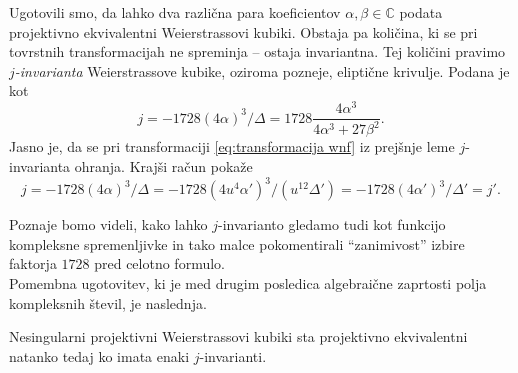 \documentclass[mat1]{fmfdelo}
\newcommand{\C}{\mathbb C}
\theoremstyle{definition}
\begin{document}
Ugotovili smo, da lahko dva različna para koeficientov $\alpha, \beta \in \C$ podata projektivno ekvivalentni Weierstrassovi kubiki. Obstaja pa količina, ki se pri tovrstnih transformacijah ne spreminja -- ostaja invariantna. Tej količini pravimo \emph{$j$-invarianta} Weierstrassove kubike, oziroma pozneje, eliptične krivulje. Podana je kot 
\[
    j = -1728(4\alpha)^3/\Delta = 1728\frac{4\alpha^3}{4\alpha^3 + 27\beta^2}.  
\] 
Jasno je, da se pri transformaciji \eqref{eq:transformacija wnf} iz prejšnje leme $j$-invarianta ohranja. Krajši račun pokaže
\[
    j = -1728(4\alpha)^3/\Delta = -1728(4u^4\alpha')^3/(u^{12}\Delta') = -1728(4\alpha')^3/\Delta' = j'.
\]

Poznaje bomo videli, kako lahko $j$-invarianto gledamo tudi kot funkcijo kompleksne spremenljivke in tako malce pokomentirali ``zanimivost'' izbire faktorja $1728$ pred celotno formulo.
\\

Pomembna ugotovitev, ki je med drugim posledica algebraične zaprtosti polja kompleksnih števil, je naslednja. 

\begin{trditev}
    Nesingularni projektivni Weierstrassovi kubiki sta projektivno ekvivalentni natanko tedaj ko imata enaki $j$-invarianti.
\end{trditev}
\end{document}
